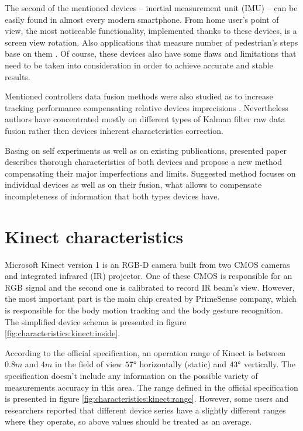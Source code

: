 \documentclass{llncs}
\begin{document}
The second of the mentioned devices -- inertial measurement unit (IMU) -- can be easily found in almost every modern smartphone. From home user's point of view, the most noticeable functionality, implemented thanks to these devices, is a screen view rotation. Also applications that measure number of pedestrian's steps base on them \cite{Jayalath2013,walklogger}. Of course, these devices also have some flaws and limitations that need to be taken into consideration in order to achieve accurate and stable results.

Mentioned controllers data fusion methods were also studied as to increase tracking performance compensating relative devices imprecisions  \cite{Bo2011,Destelle2014,Murray-Smith2014,Kalkbrenner2014}. Nevertheless authors have concentrated mostly on different types of Kalman filter raw data fusion rather then devices inherent characteristics correction. 

Basing on self experiments as well as on existing publications, presented paper describes thorough characteristics of both devices and propose a new method compensating their major imperfections and limits. Suggested method focuses on individual devices as well as on their fusion, what allows to compensate incompleteness of information that both types devices have.

\section{Kinect characteristics}
Microsoft Kinect version 1 is an RGB-D camera built from two CMOS cameras and integrated infrared (IR) projector. One of these CMOS is responsible for an RGB signal and the second one is calibrated to record IR beam's view. However, the most important part is the main chip created by PrimeSense company, which is responsible for the body motion tracking and the body gesture recognition. The simplified device schema is presented in figure \ref{fig:characteristics:kinect:inside}.

According to the official specification, an operation range of Kinect is between  $0.8m$ and $4m$ in the field of view $57\degree$ horizontally (static) and $43\degree$ vertically. The specification doesn't include any information on the possible variety of measurements accuracy in this area. The range defined in the official specification is presented in figure \ref{fig:characteristics:kinect:range}. However, some users \cite{stack:kinect2011} and researchers \cite{DiFilippo2015} reported that different device series have a slightly different ranges where they operate, so above values should be treated as an average.
\end{document}
